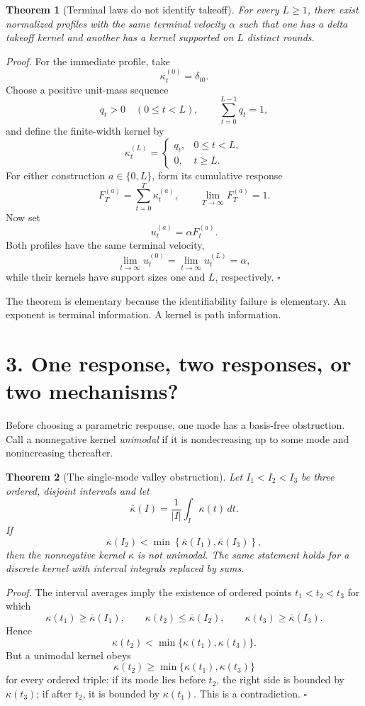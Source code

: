 \documentclass[10pt]{article}
\theoremstyle{compact}
\newtheorem{theorem}{Theorem}
\begin{document}
\begin{theorem}[Terminal laws do not identify takeoff]
For every \(L\ge1\), there exist normalized profiles with the same terminal
velocity \(\alpha\) such that one has a delta takeoff kernel and another has a
kernel supported on \(L\) distinct rounds.
\end{theorem}

\emph{Proof.}
For the immediate profile, take
\[
\kappa_t^{(0)}=\delta_{t0}.
\]
Choose a positive unit-mass sequence
\[
q_t>0\quad(0\le t<L),
\qquad
\sum_{t=0}^{L-1}q_t=1,
\]
and define the finite-width kernel by
\[
\kappa_t^{(L)}=
\begin{cases}
q_t,&0\le t<L,\\
0,&t\ge L.
\end{cases}
\]
For either construction \(a\in\{0,L\}\), form its cumulative response
\[
F_T^{(a)}=\sum_{t=0}^{T}\kappa_t^{(a)},
\qquad
\lim_{T\to\infty}F_T^{(a)}=1.
\]
Now set
\[
u_t^{(a)}=\alpha F_t^{(a)}.
\]
Both profiles have the same terminal velocity,
\[
\lim_{t\to\infty}u_t^{(0)}
=\lim_{t\to\infty}u_t^{(L)}
=\alpha,
\]
while their kernels have support sizes one and \(L\), respectively.
\hfill\(\square\)

The theorem is elementary because the identifiability failure is elementary.
An exponent is terminal information. A kernel is path information.

\section*{3. One response, two responses, or two mechanisms?}

Before choosing a parametric response, one mode has a basis-free obstruction.
Call a nonnegative kernel \emph{unimodal} if it is nondecreasing up to some
mode and nonincreasing thereafter.

\begin{theorem}[The single-mode valley obstruction]
Let \(I_1<I_2<I_3\) be three ordered, disjoint intervals and let
\[
\bar\kappa(I)=\frac{1}{|I|}\int_I\kappa(t)\,dt.
\]
If
\[
\bar\kappa(I_2)
<\min\!\left\{\bar\kappa(I_1),\bar\kappa(I_3)\right\},
\]
then the nonnegative kernel \(\kappa\) is not unimodal. The same statement
holds for a discrete kernel with interval integrals replaced by sums.
\end{theorem}

\emph{Proof.}
The interval averages imply the existence of ordered points
\(t_1<t_2<t_3\) for which
\[
\kappa(t_1)\ge\bar\kappa(I_1),\qquad
\kappa(t_2)\le\bar\kappa(I_2),\qquad
\kappa(t_3)\ge\bar\kappa(I_3).
\]
Hence
\[
\kappa(t_2)<\min\{\kappa(t_1),\kappa(t_3)\}.
\]
But a unimodal kernel obeys
\[
\kappa(t_2)\ge\min\{\kappa(t_1),\kappa(t_3)\}
\]
for every ordered triple: if its mode lies before \(t_2\), the right side is
bounded by \(\kappa(t_3)\); if after \(t_2\), it is bounded by
\(\kappa(t_1)\). This is a contradiction. \hfill\(\square\)
\end{document}

